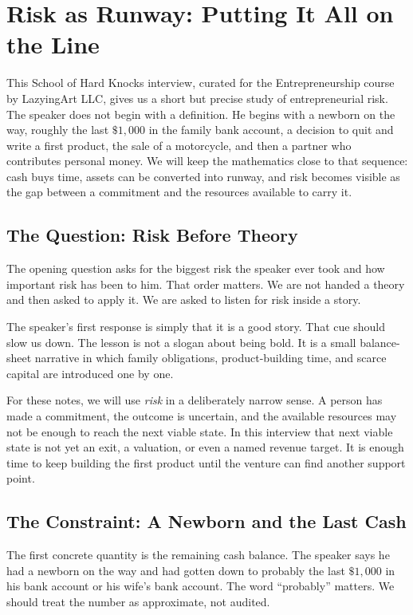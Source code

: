 \chapter{Risk as Runway: Putting It All on the Line}

This School of Hard Knocks interview, curated for the Entrepreneurship course by LazyingArt LLC, gives us a short but precise study of entrepreneurial risk. The speaker does not begin with a definition. He begins with a newborn on the way, roughly the last \(\$1{,}000\) in the family bank account, a decision to quit and write a first product, the sale of a motorcycle, and then a partner who contributes personal money. We will keep the mathematics close to that sequence: cash buys time, assets can be converted into runway, and risk becomes visible as the gap between a commitment and the resources available to carry it.

\section{The Question: Risk Before Theory}

The opening question asks for the biggest risk the speaker ever took and how important risk has been to him. That order matters. We are not handed a theory and then asked to apply it. We are asked to listen for risk inside a story.

The speaker's first response is simply that it is a good story. That cue should slow us down. The lesson is not a slogan about being bold. It is a small balance-sheet narrative in which family obligations, product-building time, and scarce capital are introduced one by one.

For these notes, we will use \emph{risk} in a deliberately narrow sense. A person has made a commitment, the outcome is uncertain, and the available resources may not be enough to reach the next viable state. In this interview that next viable state is not yet an exit, a valuation, or even a named revenue target. It is enough time to keep building the first product until the venture can find another support point.

\section{The Constraint: A Newborn and the Last Cash}

The first concrete quantity is the remaining cash balance. The speaker says he had a newborn on the way and had gotten down to probably the last \(\$1{,}000\) in his bank account or his wife's bank account. The word ``probably'' matters. We should treat the number as approximate, not audited.

